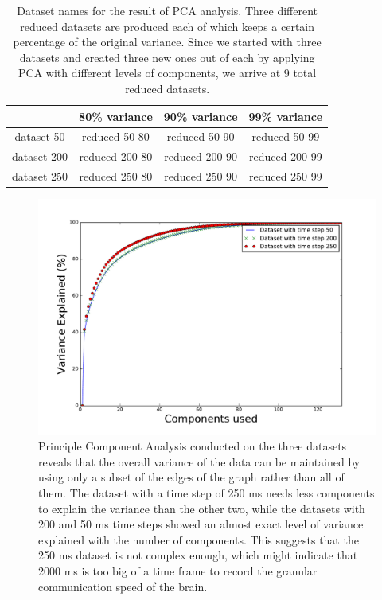 \begin{table}[H]
\centering
\caption{Dataset names for the result of PCA analysis. Three different reduced datasets are produced each of which keeps a certain percentage of the original variance. Since we started with three datasets and created three new ones out of each by applying PCA with different levels of components, we arrive at 9 total reduced datasets.}
\label{tab:pca_datasets}
\begin{tabular}{|c|c|c|c|}
\hline
  &  80\% variance &  90\% variance & 99\% variance \\ \hline
 
dataset 50 & reduced 50 80 & reduced 50 90 & reduced 50 99  \\ \hline
dataset 200 & reduced 200 80 & reduced 200 90 & reduced 200 99  \\ \hline
dataset 250 & reduced 250 80 & reduced 250 90 & reduced 250 99  \\ \hline
\end{tabular}
\end{table}


\begin{figure}[H]
  \centering
  \includegraphics[width=0.55\linewidth]{figures/variance_explained_with_pca.pdf}
  \caption{Principle Component Analysis conducted on the three datasets reveals that the overall variance of the data can be maintained by using only a subset of the edges of the graph rather than all of them. The dataset with a time step of 250 ms needs less components to explain the variance than the other two, while the datasets with 200 and 50 ms time steps showed an almost exact level of variance explained with the number of components. This suggests that the 250 ms dataset is not complex enough, which might indicate that 2000 ms is too big of a time frame to record the granular communication speed of the brain.}
  \label{fig:pca_analysis_variance}
\end{figure}

